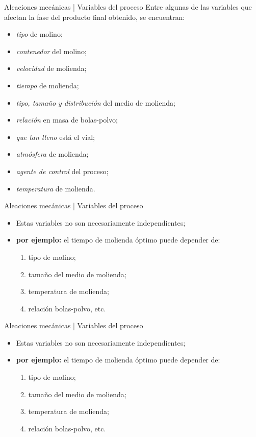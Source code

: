 \documentclass[%
spanish,
progressbar=head,
background=dark,
subsectionpage,
aspectratio=169
]{beamer}
\begin{document}
\begin{frame}{Aleaciones mecánicas | Variables del proceso}
    Entre algunas de las variables que afectan la fase del producto final obtenido, se encuentran:

    \begin{itemize}
        \item \emph{tipo} de molino;
        \item \emph{contenedor} del molino;
        \item \emph{velocidad} de molienda;
        \item \emph{tiempo} de molienda;
        \item \emph{tipo, tamaño y distribución} del medio de molienda;
        \item \emph{relación} en masa de bolas-polvo;
        \item \emph{que tan lleno} está el vial;
        \item \emph{atmósfera} de molienda;
        \item \emph{agente de control} del proceso;
        \item \emph{temperatura} de molienda.
    \end{itemize}
\end{frame}

\begin{frame}{Aleaciones mecánicas | Variables del proceso}
\begin{itemize}
    \item Estas variables no son necesariamente independientes;\\
    \item[] \textbf{por ejemplo:} el tiempo de molienda óptimo puede depender de: 
    \begin{enumerate}
        \item tipo de molino;
        \item tamaño del medio de molienda;
        \item temperatura de molienda;
        \item relación bolas-polvo, etc.
    \end{enumerate}
\end{itemize}
\end{frame}

\begin{frame}{Aleaciones mecánicas | Variables del proceso}
    \begin{itemize}
        \item Estas variables no son necesariamente independientes;\\
        \item[] \textbf{por ejemplo:} el tiempo de molienda óptimo puede depender de: 
        \begin{enumerate}
            \item tipo de molino;
            \item tamaño del medio de molienda;
            \item temperatura de molienda;
            \item relación bolas-polvo, etc.
        \end{enumerate}
    \end{itemize}
\end{frame}
\end{document}
